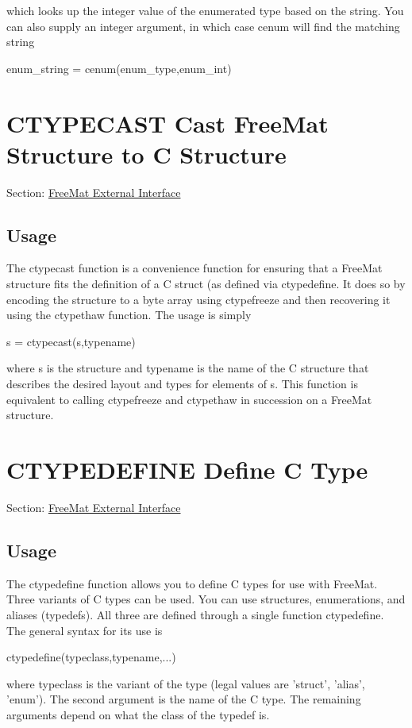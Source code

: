  which looks up the integer value of the enumerated type based on the string. You can also supply an integer argument, in which case {\ttfamily cenum} will find the matching string \begin{DoxyVerb}  enum_string = cenum(enum_type,enum_int)
\end{DoxyVerb}
 \hypertarget{external_ctypecast}{}\section{C\-T\-Y\-P\-E\-C\-A\-S\-T Cast Free\-Mat Structure to C Structure}\label{external_ctypecast}
Section\-: \hyperlink{sec_external}{Free\-Mat External Interface} \hypertarget{vtkwidgets_vtkxyplotwidget_Usage}{}\subsection{Usage}\label{vtkwidgets_vtkxyplotwidget_Usage}
The {\ttfamily ctypecast} function is a convenience function for ensuring that a Free\-Mat structure fits the definition of a C struct (as defined via {\ttfamily ctypedefine}. It does so by encoding the structure to a byte array using {\ttfamily ctypefreeze} and then recovering it using the {\ttfamily ctypethaw} function. The usage is simply \begin{DoxyVerb}   s = ctypecast(s,typename)
\end{DoxyVerb}
 where {\ttfamily s} is the structure and {\ttfamily typename} is the name of the C structure that describes the desired layout and types for elements of {\ttfamily s}. This function is equivalent to calling {\ttfamily ctypefreeze} and {\ttfamily ctypethaw} in succession on a Free\-Mat structure. \hypertarget{external_ctypedefine}{}\section{C\-T\-Y\-P\-E\-D\-E\-F\-I\-N\-E Define C Type}\label{external_ctypedefine}
Section\-: \hyperlink{sec_external}{Free\-Mat External Interface} \hypertarget{vtkwidgets_vtkxyplotwidget_Usage}{}\subsection{Usage}\label{vtkwidgets_vtkxyplotwidget_Usage}
The {\ttfamily ctypedefine} function allows you to define C types for use with Free\-Mat. Three variants of C types can be used. You can use structures, enumerations, and aliases (typedefs). All three are defined through a single function {\ttfamily ctypedefine}. The general syntax for its use is \begin{DoxyVerb}  ctypedefine(typeclass,typename,...)
\end{DoxyVerb}
 where {\ttfamily typeclass} is the variant of the type (legal values are {\ttfamily 'struct'}, {\ttfamily 'alias'}, {\ttfamily 'enum'}). The second argument is the name of the C type. The remaining arguments depend on what the class of the typedef is.


